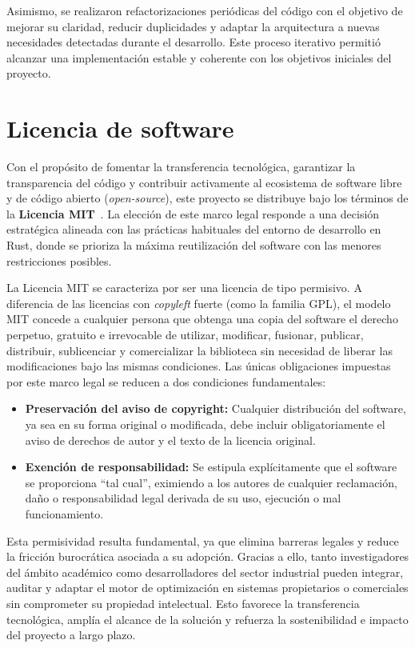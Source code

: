\documentclass[12pt,a4paper,twoside,openright]{book}
\begin{document}
    Asimismo, se realizaron refactorizaciones periódicas del código con el objetivo de mejorar su claridad, reducir duplicidades y adaptar la arquitectura a nuevas necesidades detectadas durante el desarrollo. Este proceso iterativo permitió alcanzar una implementación estable y coherente con los objetivos iniciales del proyecto.

\section{Licencia de software}
    Con el propósito de fomentar la transferencia tecnológica, garantizar la transparencia del código y contribuir activamente al ecosistema de software libre y de código abierto (\emph{open-source}), este proyecto se distribuye bajo los términos de la \textbf{Licencia MIT}~\cite{mit_license}. La elección de este marco legal responde a una decisión estratégica alineada con las prácticas habituales del entorno de desarrollo en Rust, donde se prioriza la máxima reutilización del software con las menores restricciones posibles.
    
    La Licencia MIT se caracteriza por ser una licencia de tipo permisivo. A diferencia de las licencias con \emph{copyleft} fuerte (como la familia GPL), el modelo MIT concede a cualquier persona que obtenga una copia del software el derecho perpetuo, gratuito e irrevocable de utilizar, modificar, fusionar, publicar, distribuir, sublicenciar y comercializar la biblioteca sin necesidad de liberar las modificaciones bajo las mismas condiciones. Las únicas obligaciones impuestas por este marco legal se reducen a dos condiciones fundamentales:
    
    \begin{itemize}
        \item \textbf{Preservación del aviso de copyright:} Cualquier distribución del software, ya sea en su forma original o modificada, debe incluir obligatoriamente el aviso de derechos de autor y el texto de la licencia original.
        \item \textbf{Exención de responsabilidad:} Se estipula explícitamente que el software se proporciona ``tal cual'', eximiendo a los autores de cualquier reclamación, daño o responsabilidad legal derivada de su uso, ejecución o mal funcionamiento.
    \end{itemize}
    
    Esta permisividad resulta fundamental, ya que elimina barreras legales y reduce la fricción burocrática asociada a su adopción. Gracias a ello, tanto investigadores del ámbito académico como desarrolladores del sector industrial pueden integrar, auditar y adaptar el motor de optimización en sistemas propietarios o comerciales sin comprometer su propiedad intelectual. Esto favorece la transferencia tecnológica, amplía el alcance de la solución y refuerza la sostenibilidad e impacto del proyecto a largo plazo.
\end{document}
